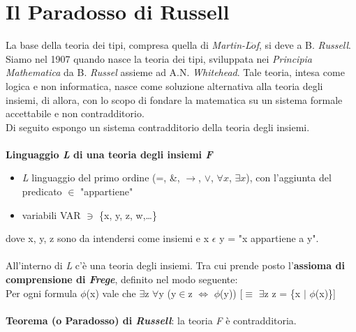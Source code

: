 \section{Il Paradosso di Russell}
\label{sec:paradosso-di-russell}
La base della teoria dei tipi, compresa quella di \textit{Martin-L$\ddot{o}$f}, si deve a B. \textit{Russell}. \\
Siamo nel 1907 quando nasce la teoria dei tipi, sviluppata nei \textit{Principia Mathematica} da B. \textit{Russel} assieme ad A.N. \textit{Whitehead}. Tale teoria, intesa come logica e non informatica, nasce come soluzione alternativa alla teoria degli insiemi, di allora, con lo scopo di fondare la matematica su un sistema formale accettabile e non contradditorio.\\
Di seguito espongo un sistema contradditorio della teoria degli insiemi.\\
\\
\textbf{Linguaggio \textit{L} di una teoria degli insiemi \textit{F}}\mbox{}
\begin{itemize}
\item \textit{L} linguaggio del primo ordine (=, \&, $\rightarrow$, $\lor$, $\forall{x}$, $\exists{x}$), con l'aggiunta del predicato $\in$ "appartiene"
\item variabili VAR $\ni$ \{x, y, z, w,\dots \}
\end{itemize}
\noindent
dove x, y, z sono da intendersi come insiemi e x $\epsilon$ y = "x appartiene a y".\\\\
All'interno di \textit{L} c'\`e una teoria degli insiemi. Tra cui prende posto l'\textbf{assioma di comprensione di \textit{Frege}}, definito nel modo seguente:\\
Per ogni formula $\phi$(x) vale che $\exists$z $\forall$y (y$\in$z $\Leftrightarrow$ $\phi$(y)) [$\equiv$ $\exists$z z = \{x $\big|$ $\phi$(x)\}]\\\\
\textbf{Teorema (o Paradosso) di \textit{Russell}}: la teoria \textit{F} \`e contradditoria.\\

